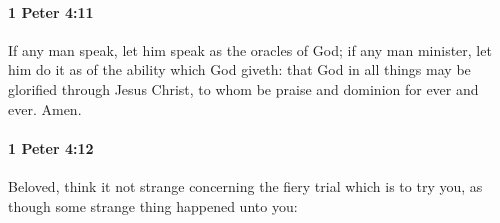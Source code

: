 		\paragraph{1 Peter 4:11} %
			\label{1PETER-4-11}

			If any man speak, let him speak as the oracles of God; if any man minister, let him do it as of the ability which God giveth: that God in all things may be glorified through Jesus Christ, to whom be praise and dominion for ever and ever.  Amen.

			\begin{framed}
			\scriptsize
				\begin{compactdesc}
					\item[SBLG] 
				\end{compactdesc}
			\end{framed}

		\paragraph{1 Peter 4:12} %
			\label{1PETER-4-12}

			Beloved, think it not strange concerning the fiery trial which is to try you, as though some strange thing happened unto you:

